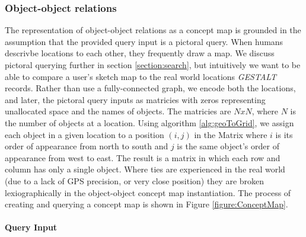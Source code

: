 \subsubsection{Object-object relations}
The representation of object-object relations as a concept map is grounded in the assumption that the provided query input is a pictoral query. 
When humans descrivbe locations to each other, they frequently draw a map. 
We discuss pictoral querying further in section \ref{section:search}, but intuitively we want to be able to compare a user's sketch map to the real world locations \emph{GESTALT} records. 
Rather than use a fully-connected graph, we encode both the locations, and later, the pictoral query inputs as matricies with zeros representing unallocated space and the names of objects. 
The matricies are $NxN$, where $N$ is the number of objects at a location. 
Using algorithm \ref{alg:geoToGrid}, we assign each object in a given location to a position $(i,j)$ in the Matrix where $i$ is its order of appearance from north to south and $j$ is the same object's order of appearance from west to east. 
The result is a matrix in which each row and column has only a single object. 
Where ties are experienced in the real world (due to a lack of GPS precision, or very close position) they are broken lexiographically in the object-object concept map instantiation.
The process of creating and querying a concept map is shown in Figure \ref{figure:ConceptMap}.

\paragraph{Query Input}

